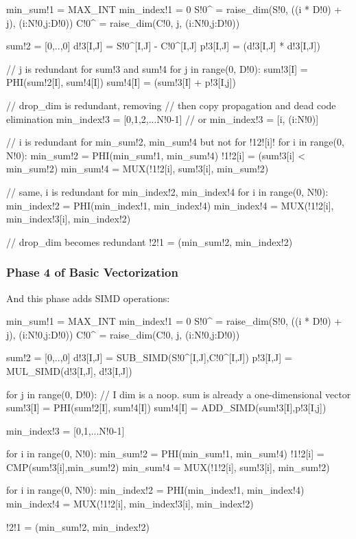 {\small
\begin{pythonn}
min_sum!1 = MAX_INT
min_index!1 = 0
S!0^ = raise_dim(S!0, ((i * D!0) + j), (i:N!0,j:D!0))
C!0^ = raise_dim(C!0, j, (i:N!0,j:D!0))

sum!2 = [0,..,0]
d!3[I,J] = S!0^[I,J] - C!0^[I,J]
p!3[I,J] = (d!3[I,J] * d!3[I,J])

// j is redundant for sum!3 and sum!4
for j in range(0, D!0):
  sum!3[I] = PHI(sum!2[I], sum!4[I])       
  sum!4[I] = (sum!3[I] + p!3[I,j])

// drop_dim is redundant, removing
// then copy propagation and dead code elimination 
min_index!3 = [0,1,2,...N!0-1] // or min_index!3 = [i, (i:N!0)]

// i is redundant for min_sum!2, min_sum!4 but not for !12![i]!
for i in range(0, N!0):
  min_sum!2 = PHI(min_sum!1, min_sum!4) 
  !1!2[i] = (sum!3[i] < min_sum!2)
  min_sum!4 = MUX(!1!2[i], sum!3[i], min_sum!2)

// same, i is redundant for min_index!2, min_index!4
for i in range(0, N!0):
  min_index!2 = PHI(min_index!1, min_index!4)  
   min_index!4 = MUX(!1!2[i], min_index!3[i], min_index!2)

// drop_dim becomes redundant
!2!1 = (min_sum!2, min_index!2)
\end{pythonn}
}

\subsubsection{Phase 4 of Basic Vectorization}

And this phase adds SIMD operations:

{\small
\begin{pythonn}
min_sum!1 = MAX_INT
min_index!1 = 0
S!0^ = raise_dim(S!0, ((i * D!0) + j), (i:N!0,j:D!0))
C!0^ = raise_dim(C!0, j, (i:N!0,j:D!0))

sum!2 = [0,..,0]
d!3[I,J] = SUB_SIMD(S!0^[I,J],C!0^[I,J])
p!3[I,J] = MUL_SIMD(d!3[I,J], d!3[I,J])

for j in range(0, D!0):
  // I dim is a noop. sum is already a one-dimensional vector
  sum!3[I] = PHI(sum!2[I], sum!4[I])       
  sum!4[I] = ADD_SIMD(sum!3[I],p!3[I,j])

min_index!3 = [0,1,...N!0-1]   

for i in range(0, N!0):
  min_sum!2 = PHI(min_sum!1, min_sum!4) 
  !1!2[i] = CMP(sum!3[i],min_sum!2)
  min_sum!4 = MUX(!1!2[i], sum!3[i], min_sum!2)
    
for i in range(0, N!0):
  min_index!2 = PHI(min_index!1, min_index!4)  
  min_index!4 = MUX(!1!2[i], min_index!3[i], min_index!2)
   
!2!1 = (min_sum!2, min_index!2)   
\end{pythonn}
}


